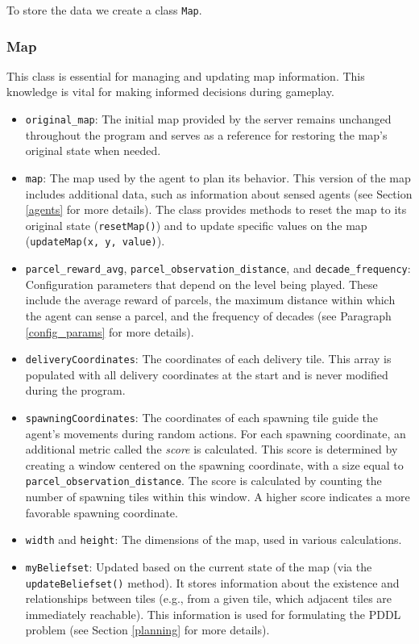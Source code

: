 \documentclass[10pt]{article}
\begin{document}
To store the data we create a class \texttt{Map}.

\subsubsection{Map}
This class is essential for managing and updating map information. This knowledge is vital for making informed decisions during gameplay.

\begin{itemize}
    \item \texttt{original\_map}: The initial map provided by the server remains unchanged throughout the program and serves as a reference for restoring the map's original state when needed.
    \item \texttt{map}: The map used by the agent to plan its behavior. This version of the map includes additional data, such as information about sensed agents (see Section \ref{agents} for more details). The class provides methods to reset the map to its original state (\texttt{resetMap()}) and to update specific values on the map (\texttt{updateMap(x, y, value)}).
    \item \texttt{parcel\_reward\_avg}, \texttt{parcel\_observation\_distance}, and \texttt{decade\_frequency}: Configuration parameters that depend on the level being played. These include the average reward of parcels, the maximum distance within which the agent can sense a parcel, and the frequency of decades (see Paragraph \ref{config_params} for more details).
    \item \texttt{deliveryCoordinates}: The coordinates of each delivery tile. This array is populated with all delivery coordinates at the start and is never modified during the program.
    \item \texttt{spawningCoordinates}: The coordinates of each spawning tile guide the agent's movements during random actions. For each spawning coordinate, an additional metric called the \textit{score} is calculated. This score is determined by creating a window centered on the spawning coordinate, with a size equal to \texttt{parcel\_observation\_distance}. The score is calculated by counting the number of spawning tiles within this window. A higher score indicates a more favorable spawning coordinate.
    \item \texttt{width} and \texttt{height}: The dimensions of the map, used in various calculations.
    \item \texttt{myBeliefset}: Updated based on the current state of the map (via the \texttt{updateBeliefset()} method). It stores information about the existence and relationships between tiles (e.g., from a given tile, which adjacent tiles are immediately reachable). This information is used for formulating the PDDL problem (see Section \ref{planning} for more details).
\end{itemize}
\end{document}
